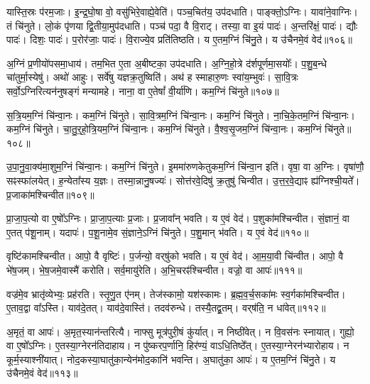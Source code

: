 यास्ति॒स्रः प॑रम॒जाः। इ॒न्द्र॒घो॒षा वो॒ वसु॑भिरे॒वाह्ये॒वेति॑। 
पञ्च॒\-चित॑य॒ उप॑दधाति। पाङ्क्तो॒\-ऽग्निः। 
यावा॑ने॒वाग्निः। तं चि॑नुते। 
लो॒कं पृ॑णया द्वि॒तीया॒मुप॑\-दधाति। पञ्च॑ पदा॒ वै वि॒राट्। 
तस्या॒ वा इ॒यं पादः॑। अ॒न्तरि॑क्षं॒ पादः॑। द्यौः पादः॑। 
दिशः॒ पादः॑। प॒रोर॑जाः॒ पादः॑। वि॒राज्ये॒व प्रति॑तिष्ठति। 
य ए॒तम॒ग्निं चि॑नु॒ते। य उ॑चैनमे॒वं वेद॑॥१०६॥\ip\anuvakamend


अ॒ग्निं प्र॒णीयो॑पसमा॒धाय॑। तम॒भित ए॒ता अ॒बीष्टका॒ उप॑दधाति। 
अ॒ग्नि॒हो॒त्रे द॑र्शपूर्णमा॒सयोः᳚। प॒शु॒ब॒न्धे चा॑तुर्मा॒स्येषु॑। 
अथो॑ आहुः। सर्वे॑षु यज्ञक्र॒तुष्विति॑। 
अथ॑ ह स्माहारु॒णः स्वा॑य॒म्भुवः॑। सा॒वि॒त्रः सर्वो॒\-ऽग्निरित्यन॑नुषङ्गं मन्यामहे। 
नाना॒ वा ए॒तेषां᳚ वी॒र्या॑णि। कम॒ग्निं चि॑नुते॥१०७॥\ip


स॒त्रि॒यम॒ग्निं चि॑न्वा॒नः। कम॒ग्निं चि॑नुते। 
सा॒वि॒त्रम॒ग्निं चि॑न्वा॒नः। कम॒ग्निं चि॑नुते। 
ना॒चि॒के॒तम॒ग्निं चि॑न्वा॒नः। कम॒ग्निं चि॑नुते। 
चा॒तु॒र्॒‌हो॒त्रि॒य\-म॒ग्निं चि॑न्वा॒नः। कम॒ग्निं चि॑नुते। 
वै॒श्व॒सृ॒जम॒ग्निं चि॑न्वा॒नः। कम॒ग्निं चि॑नुते॥१०८॥\ip


उ॒पा॒नु॒वा॒क्य॑मा॒शुम॒ग्निं चि॑न्वा॒नः। कम॒ग्निं चि॑नुते। 
इ॒म\-मा॑रुण\-केतुक\-म॒ग्निं चि॑न्वा॒न इति॑। वृषा॒ वा अ॒ग्निः। 
वृषा॑णौ॒ सꣴस्फा॑लयेत्। ह॒न्येता᳚स्य य॒ज्ञः। 
तस्मा॒न्नानु॒षज्यः॑। सोत्त॑रवे॒दिषु॑ क्र॒तुषु॑ चिन्वीत। 
उ॒त्त॒र॒वे॒द्याꣴ ह्य॑ग्निश्ची॒यते᳚। प्र॒जाका॑मश्चिन्वीत॥१०९॥\ip


प्रा॒जा॒प॒त्यो वा ए॒षो᳚\-ऽग्निः। प्रा॒जा॒प॒त्याः प्र॒जाः। 
प्र॒जावा᳚न्‌ भवति। य ए॒वं वेद॑। 
प॒शुका॑मश्चिन्वीत। सं॒ज्ञानं॒ वा ए॒तत् प॑शू॒नाम्। 
यदापः॑। प॒शू॒नामे॒व सं॒ज्ञाने॒\-ऽग्निं चि॑नुते। 
प॒शु॒मान् भ॑वति। य ए॒वं वेद॑॥११०॥\ip


वृष्टि॑कामश्चिन्वीत। आपो॒ वै वृष्टिः॑। 
प॒र्जन्यो॒ वर्‌षु॑को भवति। य ए॒वं वेद॑। 
आ॒म॒या॒वी चि॑न्वीत। आपो॒ वै भे॑ष॒जम्। 
भे॒ष॒जमे॒वास्मै॑ करोति। सर्व॒मायु॑रेति। 
अ॒भि॒चरꣴ॑श्चिन्वीत। वज्रो॒ वा आपः॑॥१११॥\ip


वज्र॑मे॒व भ्रातृ॑व्येभ्यः॒ प्रह॑रति। स्तृ॒णु॒त ए॑नम्। 
तेज॑स्कामो॒ यश॑स्कामः। ब्र॒ह्म॒व॒र्च॒सका॑मः स्व॒र्ग\-का॑मश्चिन्वीत। 
ए॒ताव॒द्वा वा᳚\-ऽस्ति। याव॑दे॒तत्। 
याव॑दे॒वास्ति॑। तदव॑रुन्धे। 
तस्यै॒तद्व्र॒तम्। वर्‌ष॑ति॒ न धा॑वेत्॥११२॥\ip


अ॒मृतं॒ वा आपः॑। अ॒मृत॒स्यान॑न्तरित्यै। 
नाफ्सु मूत्र॑पुरी॒षं कु॑र्यात्। न निष्ठी॑वेत्। 
न वि॒वस॑नः स्नायात्। गुह्यो॒ वा ए॒षो᳚\-ऽग्निः। 
ए॒तस्या॒ग्नेरन॑तिदाहाय। न पु॑ष्करप॒र्णानि॒ हिर॑ण्यं॒ वा\-ऽधि॒तिष्ठे᳚त्। 
ए॒तस्या॒ग्नेरन॑भ्यारोहाय। न कूर्म॒स्याश्नी॑यात्। 
नोद॒कस्या॒घातु॑का॒न्येन॑\-मोद॒कानि॑ भवन्ति। अ॒घातु॑का॒ आपः॑। 
य ए॒तम॒ग्निं चि॑नु॒ते। य उ॑चैनमे॒वं वेद॑॥११३॥\ip\anuvakamend


